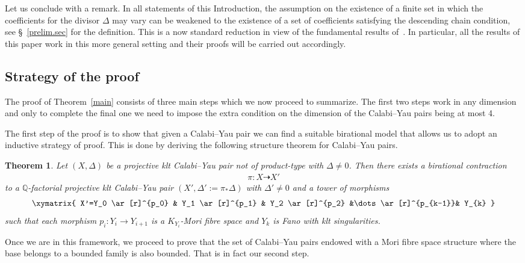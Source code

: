 \documentclass{amsart}[12pt,a4paper]
\newtheorem{theorem}{Theorem}[section]
\theoremstyle{definition}
\begin{document}
Let us conclude with a remark. 
In all statements of this Introduction, the assumption on the existence of a finite set in which the coefficients for the divisor $\Delta$ may vary can be weakened to the existence of a set of coefficients satisfying the descending chain condition, see \S~\ref{prelim.sec} for the definition.
This is a now standard reduction in view of the fundamental results of~\cite{HMX14}. 
In particular, all the results of this paper work in this more general setting and their proofs will be carried out accordingly.

\subsection{Strategy of the proof} 
The proof of Theorem~\ref{main} consists of three main steps which we now proceed to summarize. 
The first two steps work in any dimension and only to complete the final one we need to impose the extra condition on the dimension of the Calabi--Yau pairs being at most 4.

The first step of the proof is to show that given a Calabi--Yau pair we can find a suitable birational model that allows us to adopt an inductive strategy of proof. 
This is done by deriving the following structure theorem for Calabi--Yau pairs.
\begin{theorem}
\label{notproduct}
Let $(X,\Delta)$ be a projective klt Calabi--Yau pair not of product-type with $\Delta \neq 0$. 
Then there exists a birational contraction 
\begin{align*}
		\pi \colon X \dashrightarrow X'
\end{align*}
to a $\mathbb{Q}$-factorial projective klt Calabi--Yau pair $(X', \Delta' := \pi_\ast \Delta)$ with $\Delta' \neq 0$ and a tower of morphisms
	\begin{displaymath}
		\xymatrix{
			X'=Y_0 \ar[r]^{p_0} & Y_1 \ar[r]^{p_1} & Y_2 \ar[r]^{p_2} &\dots 
			\ar[r]^{p_{k-1}}& Y_{k}
		}
\end{displaymath}		
\noindent	
such that each morphism $p_i\colon Y_i \to Y_{i+1}$ is a $K_{Y_i}$-Mori fibre space and $Y_k$ is Fano with klt singularities.
\end{theorem}

Once we are in this framework, we proceed to prove that the set of Calabi--Yau pairs endowed with a Mori fibre space structure where the base belongs to a bounded family is also bounded.
That is in fact our second step.
\end{document}

